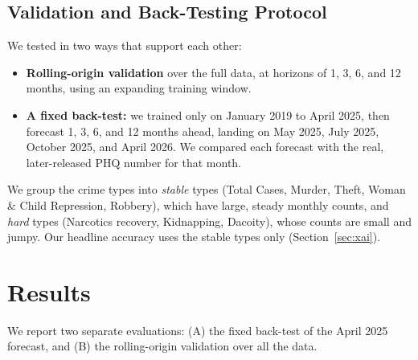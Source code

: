 \documentclass[conference]{IEEEtran}
\begin{document}
\subsection{Validation and Back-Testing Protocol}
We tested in two ways that support each other:
\begin{itemize}
  \item \textbf{Rolling-origin validation} over the full data, at horizons of 1, 3, 6, and 12
        months, using an expanding training window.
  \item \textbf{A fixed back-test:} we trained only on January 2019 to April 2025, then forecast
        1, 3, 6, and 12 months ahead, landing on May 2025, July 2025, October 2025, and April 2026. We compared
        each forecast with the real, later-released PHQ number for that month.
\end{itemize}
We group the crime types into \emph{stable} types (Total Cases, Murder, Theft, Woman \& Child
Repression, Robbery), which have large, steady monthly counts, and \emph{hard} types (Narcotics
recovery, Kidnapping, Dacoity), whose counts are small and jumpy. Our headline accuracy uses the
stable types only (Section~\ref{sec:xai}).

\section{Results}
\label{sec:results}
We report two separate evaluations: (A) the fixed back-test of the April 2025
forecast, and (B) the rolling-origin validation over all the data.
\end{document}
